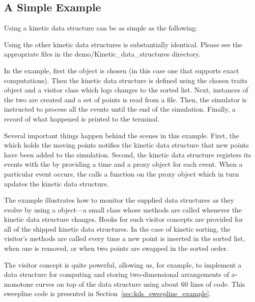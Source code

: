 \subsection{A Simple Example \label{sec:kds_sort_example}}


Using a kinetic data structure can be as simple as the following:
\label{fig:kds_sort_program}

Using the other kinetic data
structures is substantially identical. Please see the appropriate
files in the demo/Kinetic\_data\_structures directory.

In the example, first the  object is chosen
(in this case one that supports exact computations). Then the kinetic
data structure is defined using the chosen traits object and a
visitor class which logs changes to the sorted list.  Next, instances
of the two are created and a set of points is read from a file. Then,
the simulator is instructed to process all the events until the end of
the simulation.  Finally, a record of what happened is printed to the
terminal.

Several important things happen behind the scenes in this example.
First, the  which holds the moving
points notifies the kinetic data structure that new points have been
added to the simulation. Second, the
 kinetic data structure registers
its events with the  by providing a time and a
proxy object for each event. When a particular event occurs, the
 calls a function on the proxy object which in turn
updates the kinetic data structure.

The example illustrates how to monitor the supplied data structures as
they evolve by using a  object---a small class whose
methods are called whenever the kinetic data structure changes. Hooks
for such visitor concepts are provided for all of the shipped kinetic
data structures. In the case of kinetic sorting, the visitor's
methods are called every time a new point is inserted in the sorted
list, when one is removed, or when two points are swapped in the
sorted order. 


The visitor concept is quite powerful, allowing us, for example, to
implement a data structure for computing and storing two-dimensional
arrangements of $x$-monotone curves on top of the
 data structure using about 60
lines of code. This sweepline code is presented in
Section~\ref{sec:kds_sweepline_example}.

